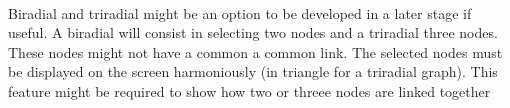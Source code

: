 \paragraph*{}
Biradial and triradial might be an option to be developed in a later stage if useful. A biradial will consist in selecting two nodes and a triradial three nodes. These nodes might not have a common a common link. The selected nodes must be displayed on the screen harmoniously (in triangle for a triradial graph). This feature might be required to show how two or threee nodes are linked together